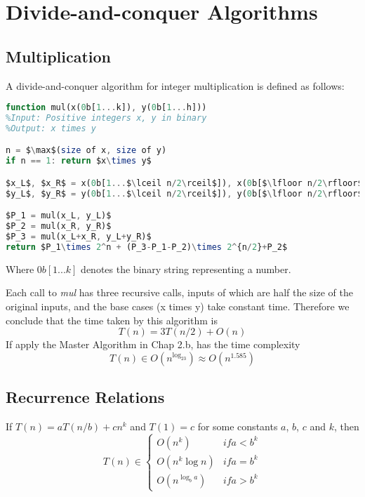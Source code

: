 \section{Divide-and-conquer Algorithms}

\subsection{Multiplication}

\begin{definition}
A divide-and-conquer algorithm for integer multiplication is defined as follows:
\begin{lstlisting}[mathescape=true, language=Octave]
function mul(x(0b[1...k]), y(0b[1...h]))
%Input: Positive integers x, y in binary
%Output: x times y

n = $\max$(size of x, size of y)
if n == 1: return $x\times y$

$x_L$, $x_R$ = x(0b[1...$\lceil n/2\rceil$]), x(0b[$\lfloor n/2\rfloor$...n])
$y_L$, $y_R$ = y(0b[1...$\lceil n/2\rceil$]), y(0b[$\lfloor n/2\rfloor$...n])

$P_1 = mul(x_L, y_L)$
$P_2 = mul(x_R, y_R)$
$P_3 = mul(x_L+x_R, y_L+y_R)$
return $P_1\times 2^n + (P_3-P_1-P_2)\times 2^{n/2}+P_2$
\end{lstlisting}
Where $0b[1...k]$ denotes the binary string representing a number.
\end{definition}
Each call to \textit{mul} has three recursive calls, inputs of which are half the size of the original inputs, and the base cases (x times y) take constant time. Therefore we conclude that the time taken by this algorithm is
\[
T(n) = 3T(n/2)+O(n)
\]
If apply the Master Algorithm in Chap 2.b, has the time complexity
\[
T(n) \in O(n^{\log_23}) \approx O(n^{1.585})
\]

\subsection{Recurrence Relations}

\begin{theorem}
If $T(n) = aT(n/b) + cn^k$ and $T(1) = c$ for some constants $a$, $b$, $c$ and $k$, then
\begin{equation*}
T(n) \in \begin{cases}
O(n^k) &if a<b^k \\
O(n^k\log n) &if a=b^k \\
O(n^{\log_ba}) &if a>b^k
\end{cases}
\end{equation*}
\end{theorem}

